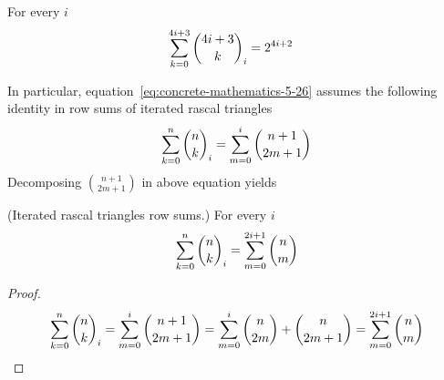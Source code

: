 \begin{proposition}
    For every $i$
    \begin{align*}
        \sum_{k=0}^{4i+3} \binom{4i+3}{k}_{i} &= 2^{4i+2}
    \end{align*}
\end{proposition}
In particular, equation~\eqref{eq:concrete-mathematics-5-26} assumes the following identity in
row sums of iterated rascal triangles
\begin{align*}
    \sum_{k=0}^n \binom{n}{k}_{i} = \sum_{m=0}^{i} \binom{n+1}{2m+1}
\end{align*}
Decomposing $\binom{n+1}{2m+1}$ in above equation yields
\begin{proposition} (Iterated rascal triangles row sums.)
    For every $i$
    \begin{align*}
        \sum_{k=0}^{n} \binom{n}{k}_{i} = \sum_{m=0}^{2i+1} \binom{n}{m}
    \end{align*}
    \begin{proof}
        \begin{align*}
            \sum_{k=0}^n \binom{n}{k}_{i} = \sum_{m=0}^{i} \binom{n+1}{2m+1} = \sum_{m=0}^{i} \binom{n}{2m} + \binom{n}{2m+1} = \sum_{m=0}^{2i+1} \binom{n}{m}
        \end{align*}
    \end{proof}
\end{proposition}
